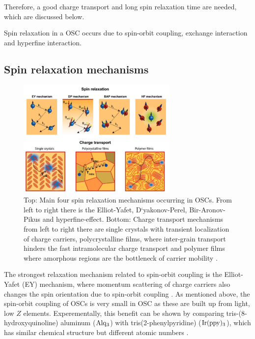 Therefore, a good charge transport and long spin relaxation time are needed, which are discussed below.

Spin relaxation in a OSC occurs due to spin-orbit coupling, exchange interaction and hyperfine interaction.


\subsection{Spin relaxation mechanisms}

\begin{figure}
  \centering
  \includegraphics[width=0.7\textwidth]{graphics/relaxation.png}
  \caption[width=0.85\textwidth]{Top: Main four spin relaxation mechanisms occurring in OSCs. From left to right there is the Elliot-Yafet, D`yakonov-Perel, Bir-Aronov-Pikus and hyperfine-effect. Bottom: Charge transport mechanisms from left to right there are single crystals with transient localization of charge carriers, polycrystalline films, where inter-grain transport hinders the fast intramolecular charge transport and polymer films where amorphous regions are the bottleneck of carrier mobility \cite{perovskite}.}
  \label{fig:relaxation}
\end{figure}

The strongest relaxation mechanism related to spin-orbit coupling is the Elliot-Yafet (EY) mechanism, where momentum scattering of charge carriers also changes the spin orientation due to spin-orbit coupling \cite{elliott}.
As mentioned above, the spin-orbit coupling of OSCs is very small in OSC as these are built up from light, low $Z$ elements.
Experementally, this benefit can be shown by comparing tris-(8-hydroxyquinoline) aluminum ($\ce{Alq_3}$) with tris(2-phenylpyridine) ($\ce{Ir(ppy)_3}$), which has similar chemical structure but different atomic numbers \cite{perovskite} \cite{single-crystals}.

